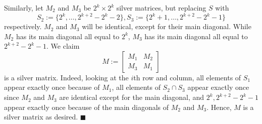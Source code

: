 \documentclass[14pt]{article}
\begin{document}
Similarly, let $M_2$ and $M_3$ be $2^k\times 2^k$ silver matrices, but replacing $S$ with
\[ S_2:=\{2^k,\ldots,2^{k+2}-2^k-2\},S_3:=\{2^k+1,\ldots,2^{k+2}-2^k-1\} \]
respectively. $M_2$ and $M_3$ will be identical, except for their main diagonal. While $M_2$ has its main diagonal all equal to $2^k$, $M_3$ has its main diagonal all equal to $2^{k+2}-2^k-1$. We claim
\[ M := \begin{bmatrix}
	M_1&M_2\\
	M_3&M_1
\end{bmatrix} \]
is a silver matrix. Indeed, looking at the $i$th row and column, all elements of $S_1$ appear exactly once because of $M_1$, all elements of $S_2\cap S_3$ appear exactly once since $M_2$ and $M_3$ are identical except for the main diagonal, and $2^k,2^{k+2}-2^k-1$ appear exactly once because of the main diagonals of $M_2$ and $M_3$. Hence, $M$ is a silver matrix as desired. $\blacksquare$
	
\end{document}
